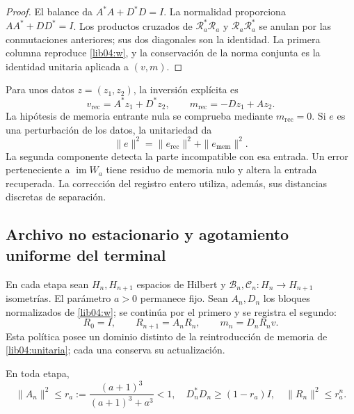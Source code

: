 \begin{proof}
El balance da \(A^*A+D^*D=I\). La normalidad proporciona
\(AA^*+DD^*=I\). Los productos cruzados de
\(\mathscr R_a^*\mathscr R_a\) y
\(\mathscr R_a\mathscr R_a^*\) se anulan por las conmutaciones
anteriores; sus dos diagonales son la identidad. La primera columna
reproduce \eqref{lib04:w}, y la conservación de la norma conjunta
es la identidad unitaria aplicada a \((v,m)\).
\end{proof}

Para unos datos \(z=(z_1,z_2)\), la inversión explícita es
\begin{equation}
 v_{\mathrm{rec}}=A^*z_1+D^*z_2,\qquad
 m_{\mathrm{rec}}=-Dz_1+Az_2.
 \label{lib04:inversa-unitaria}
\end{equation}
La hipótesis de memoria entrante nula se comprueba mediante
\(m_{\mathrm{rec}}=0\). Si \(e\) es una perturbación de los datos,
la unitariedad da
\begin{equation}
 \|e\|^2=\|e_{\mathrm{rec}}\|^2+\|e_{\mathrm{mem}}\|^2.
 \label{lib04:descomposicion-ruido}
\end{equation}
La segunda componente detecta la parte incompatible con esa entrada.
Un error perteneciente a \(\operatorname{im}W_a\) tiene residuo de
memoria nulo y altera la entrada recuperada. La corrección del registro
entero utiliza, además, sus distancias discretas de separación.



\subsection{Archivo no estacionario y agotamiento uniforme del terminal}
\label{lib04:archivo}

En cada etapa sean \(H_n,H_{n+1}\) espacios de Hilbert y
\(\mathcal B_n,\mathcal C_n:H_n\to H_{n+1}\) isometrías. El
parámetro \(a>0\) permanece fijo. Sean \(A_n,D_n\) los bloques
normalizados de \eqref{lib04:w}; se continúa por el primero y se
registra el segundo:
\begin{equation}
 R_0=I,\qquad R_{n+1}=A_nR_n,\qquad m_n=D_nR_nv.
 \label{lib04:politica-archivo}
\end{equation}
Esta política posee un dominio distinto de la reintroducción de
memoria de \eqref{lib04:unitaria}; cada una conserva su actualización.

\begin{lemma}
\label{lib04:lem-tasa}
En toda etapa,
\begin{equation}
 \|A_n\|^2\leq r_a:={\frac{(a+1)^3}{(a+1)^3+a^3}}<1,
 \quad D_n^*D_n\geq(1-r_a)I,
 \quad\|R_n\|^2\leq r_a^n.
 \label{lib04:tasa}
\end{equation}
\end{lemma}

